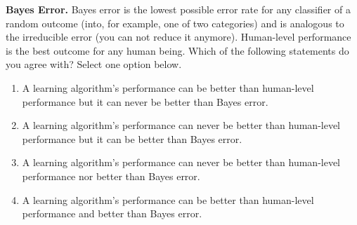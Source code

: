 \item {}
\textbf{Bayes Error.}
Bayes error is the lowest possible error rate for any classifier of a random outcome (into, for example, one of two categories) and is analogous to the irreducible error (you can not reduce it anymore). Human-level performance is the best outcome for any human being. Which of the following statements do you agree with?	Select one option below.

\begin{enumerate}[label=(\alph*)]
    \item  A learning algorithm’s performance can be better than human-level performance but it can never be better than Bayes error.
    \item  A learning algorithm’s performance can never be better than human-level performance but it can be better than Bayes error.	
    \item A learning algorithm’s performance can never be better than human-level performance nor better than Bayes error.
    \item A learning algorithm’s performance can be better than human-level performance and better than Bayes error. 
\end{enumerate} 
